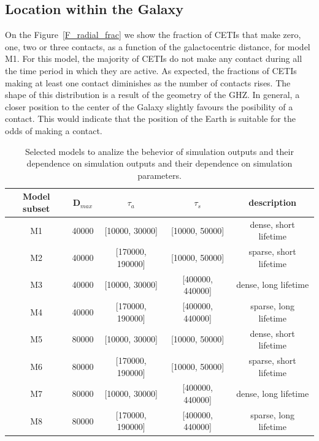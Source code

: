 \documentclass[crop]{CSLB}%
\begin{document}
              
                 

\subsection{Location within the Galaxy}\label{SS_location}
    
On the Figure~\ref{F_radial_frac} we show the fraction of CETIs that make
zero, one, two or three contacts, as a function of the galactocentric
distance, for model M1.
%
For this model, the majority of CETIs do not
make any contact during all the time period in which they are active.
%
As expected, the fractions of CETIs making at least one contact
diminishes as the number of contacts rises.
%
The shape of this distribution is a result of the geometry of the GHZ.
%
In general, a closer position to the center of the Galaxy slightly favours 
the posibility of a contact.
%
This would indicate that the position of the Earth is suitable for the
odds of making a contact.


 
\setlength{\tabcolsep}{10pt}
\begin{table}
\centering
\begin{tabular}{ccccc}
\hline
Model subset & D$_{max}$ & $\tau_a$ & $\tau_s$ & description  \\
\hline
M1 & 40000 & [10000, 30000]   & [10000, 50000]   &dense, short lifetime\\
M2 & 40000 & [170000, 190000] & [10000, 50000]   &sparse, short lifetime\\
M3 & 40000 & [10000, 30000]   & [400000, 440000] &dense, long lifetime \\
M4 & 40000 & [170000, 190000] & [400000, 440000] &sparse, long lifetime\\
%
M5 & 80000 & [10000, 30000]   & [10000, 50000]   &dense, short lifetime\\
M6 & 80000 & [170000, 190000] & [10000, 50000]   &sparse, short lifetime\\
M7 & 80000 & [10000, 30000]   & [400000, 440000] &dense, long lifetime \\
M8 & 80000 & [170000, 190000] & [400000, 440000] &sparse, long lifetime\\
%
\hline
\end{tabular}
\caption{Selected models to analize the behevior of simulation outputs
   and their dependence on simulation outputs and their dependence on
   simulation parameters.}
\label{T_selected_models}
\end{table}
\end{document}
